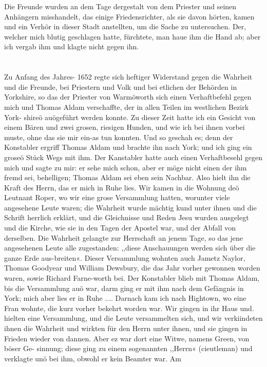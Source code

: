 Die Freunde
wurden an dem Tage dergestalt von dem Priester und seinen
Anhängern misshandelt, das einige Friedensrichter, als sie davon
hörten, kamen und ein Verhör in dieser Stadt anstellten, um
die Sache zu untersuchen. Der, welcher mich blutig geschlagen
hatte, fürchtete, man haue ihm die Hand ab; aber ich vergab
ihm und klagte nicht gegen ihn.

\section{}

Zu Anfang des Jahres- 1652 regte sich heftiger Widerstand
gegen die Wahrheit und die Freunde, bei Priestern und Volk
und bei etlichen der Behörden in Yorkshire, so das der Priester
von Warmöworth sich einen Verhaftbefehl gegen mich und Thomas
Aldam verschaffte, der in allen Teilen im westlichen Bezirk York-
shireö auögeführt werden konnte. Zu dieser Zeit hatte ich ein
Gesicht von einem Bären und zwei grosen, riesigen Hunden, und
wie ich bei ihnen vorbei muste, ohne das sie mir ein-as tun
konnten. Und so geschah es; denn der Konstabler ergriff Thomas
Aldam und brachte ihn nach York; und ich ging ein groseö Stück
Wegs mit ihm. Der Kanstabler hatte auch einen Verhaftbesehl
gegen mich und sagte zu mir: er sehe mich schon, aber er möge
nicht einen der ihm fremd sei, behelligen; Thomas Aldam sei
eben sein Nachbar. Also hielt ihn die Kraft des Herrn, das er
mich in Ruhe lies. Wir kamen in die Wohnung deö Leutnant
Roper, wo wir eine grose Versammlung hatten, worunter viele
angesehene Leute waren; die Wahrheit wurde mächtig kund
unter ihnen und die Schrift herrlich erklärt, und die Gleichnisse
und Reden Jesu wurden ausgelegt und die Kirche, wie sie in den
Tagen der Apostel war, und der Abfall von derselben. Die
Wahrheit gelangte zur Herrschaft an jenem Tage, so das jene
angesehenen Leute alle zugestanden: ,,diese Anschauungen werden
sich über die ganze Erde aus-breiten«. Dieser Versammlung
wohnten auch Jametz Naylor, Thomas Goodyear und William
Dewsbury, die das Jahr vorher gewonnen worden waren, sowie
Richard Farne-worth bei. Der Konstabler blieb mit Thomas
Aldam, bis die Versammlung auö war, darm ging er mit ihm
nach dem Gefängnis in York; mich aber lies er in Ruhe ....
Darnach kam ich nach Hightown, wo eine Fran wohnte, die
kurz vorher bekehrt worden war. Wir gingen in ihr Haus und.
hielten eine Versammlung, und die Leute versammelten sich, und
wir verkiindeten ihnen die Wahrheit und wirkten für den Herrn
unter ihnen, und sie gingen in Frieden wieder von dannen.
Aber ez war dort eine Witwe, namens Green, von böser Ge-
sinnung; diese ging zu einem sogenannten ,,Herrn« (cieutleman)
und verklagte unö bei ihm, obwohl er kein Beamter war. Am


